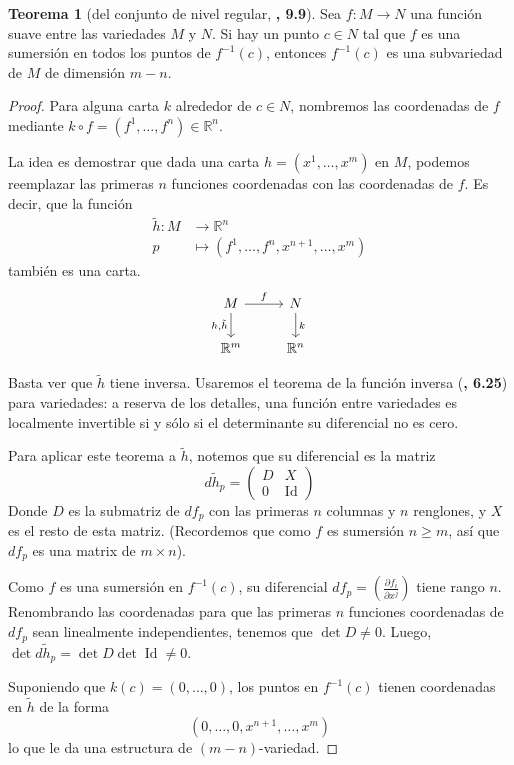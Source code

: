 \documentclass[spanish]{book}
\theoremstyle{definition}
\newtheorem*{teo}{Teorema}
\newcommand{\R}{\mathbb{R}}
\DeclareMathOperator{\Id}{Id}
\begin{document}
	\begin{teo}[del conjunto de nivel regular, \cite{Loring}\textbf{, 9.9}]
		Sea $f:M\to N$ una función suave entre las variedades $M$ y $N$. Si hay un punto $c\in N$ tal que $f$ es una sumersión en todos los puntos de $f^{-1}(c)$, entonces $f^{-1}(c)$ es una subvariedad de $M$ de dimensión $m-n$.
	\end{teo}
	\begin{proof}
		Para alguna carta $k$ alrededor de $c\in N$, nombremos las coordenadas de $f$ mediante $k\circ f=(f^1,\ldots,f^n)\in\R^n$.
		
		La idea es demostrar que dada una carta $h=(x^1,\ldots,x^m)$ en $M$, podemos reemplazar las primeras $n$ funciones coordenadas con las coordenadas de $f$. Es decir, que la función
		\begin{align*}
			\tilde{h}:M&\to\R^n\\
			p&\mapsto(f^1,\ldots,f^n,x^{n+1},\ldots,x^{m})
		\end{align*}
		también es una carta.
		\[	\begin{tikzcd}
			M\arrow{r}{f}\arrow[swap]{d}{h,\tilde{h}}&N\arrow{d}{k}\\
			\R^m&\R^n
		\end{tikzcd}\]
		
		
		Basta ver que $\tilde{h}$ tiene inversa. Usaremos el teorema de la función inversa (\cite{Loring}\textbf{, 6.25}) para variedades: a reserva de los detalles, una función entre variedades es localmente invertible si y sólo si el determinante su diferencial no es cero.
		
		Para aplicar este teorema a $\tilde{h}$, notemos que su diferencial es la matriz 
		\[d\tilde{h}_p=\begin{pmatrix}
			D&X\\
			0&\Id
		\end{pmatrix}\]
		Donde $D$ es la submatriz de $df_p$ con las primeras $n$ columnas y $n$ renglones, y $X$ es el resto de esta matriz. (Recordemos que como $f$ es sumersión $n\geq m$, así que $df_p$ es una matrix de $m\times n$).
		
		Como $f$ es una sumersión en $f^{-1}(c)$, su diferencial $df_p=\left(\frac{\partial f_i}{\partial x^j}\right)$ tiene rango $n$. Renombrando las coordenadas para que las primeras $n$ funciones coordenadas de $df_p$ sean linealmente independientes, tenemos que $\det D\neq0$. Luego, $\det d\tilde{h}_p=\det D\det\Id\neq0$.
		
		Suponiendo que $k(c)=(0,\ldots,0)$, los puntos en $f^{-1}(c)$ tienen coordenadas en $\tilde{h}$ de la forma
		\[(0,\ldots,0,x^{n+1},\ldots,x^{m})\]
		lo que le da una estructura de $(m-n)$-variedad.
	\end{proof}
\end{document}

